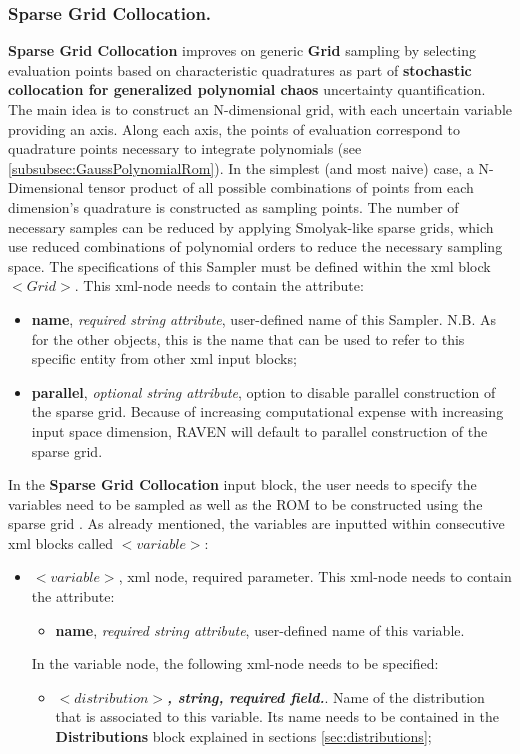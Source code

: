 \subsubsection{Sparse Grid Collocation.}
\label{subsubsubsec:SparseGridCollocation}
\textbf{Sparse Grid Collocation} improves on generic \textbf{Grid} sampling by selecting evaluation points based on characteristic quadratures as part of \textbf{stochastic collocation for generalized polynomial chaos} uncertainty quantification.  The main idea is to construct an N-dimensional grid, with each uncertain variable providing an axis.  Along each axis, the points of evaluation correspond to quadrature points necessary to integrate polynomials (see \ref{subsubsec:GaussPolynomialRom}).  In the simplest (and most  naive) case, a N-Dimensional tensor product of all possible combinations of points from each dimension's quadrature is constructed as sampling points.  The number of necessary samples can be reduced by applying Smolyak-like sparse grids, which use reduced combinations of polynomial orders to reduce the necessary sampling space.  The specifications of this Sampler must be defined within the xml block $<Grid>$. This xml-node needs to contain the attribute:
\begin{itemize}
\itemsep0em
\item \textbf{name}, \textit{required string attribute}, user-defined name of this Sampler. N.B. As for the other objects, this is the name that can be used to refer to this specific entity from other xml input blocks;
\item \textbf{parallel}, \textit{optional string attribute}, option to disable parallel construction of the sparse grid.  Because of increasing computational expense with increasing input space dimension, RAVEN will default to parallel construction of the sparse grid.
\end{itemize}
In the \textbf{Sparse Grid Collocation} input block, the user needs to specify the variables need to be sampled as well as the ROM to be constructed using the sparse grid . As already mentioned, the variables are inputted within consecutive xml blocks called $<variable>$:
\begin{itemize}
\item $<variable>$, xml node, required parameter. This xml-node needs to contain the attribute:
\begin{itemize}
  \item \textbf{name}, \textit{required string attribute}, user-defined name of this variable. 
 \end{itemize}
 In the variable node, the following xml-node needs to be specified:
 \begin{itemize}
    \item $<distribution>$\textbf{\textit{, string, required field.}}. Name of the distribution that is associated to this variable. Its name needs to be contained in the \textbf{Distributions} block explained in sections \ref{sec:distributions};
 \end{itemize} \end{itemize}
